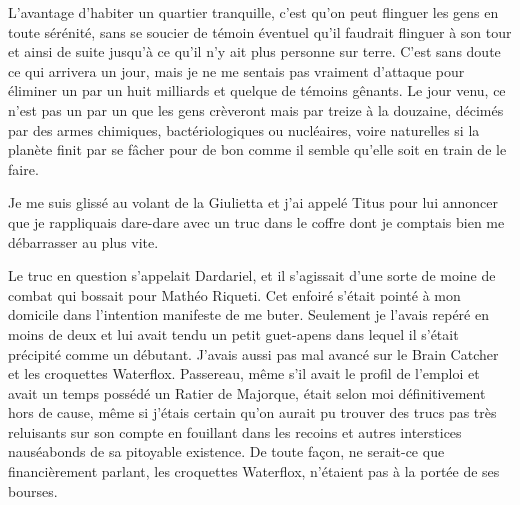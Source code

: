 L’avantage d’habiter un quartier tranquille, c’est qu’on peut flinguer les gens en toute sérénité, sans se soucier de témoin éventuel qu’il faudrait flinguer à son tour et ainsi de suite jusqu’à ce qu’il n’y ait plus personne sur terre. \label{rat:10} C’est sans doute ce qui arrivera un jour, mais je ne me sentais pas vraiment d’attaque pour éliminer un par un huit milliards et quelque de témoins gênants. Le jour venu, ce n’est pas un par un que les gens crèveront mais par treize à la douzaine, décimés par des armes chimiques, bactériologiques ou nucléaires, voire naturelles si la planète finit par se fâcher pour de bon comme il semble qu’elle soit en train de le faire.

Je me suis glissé au volant de la Giulietta et j’ai appelé Titus pour lui annoncer que je rappliquais dare-dare avec un truc dans le coffre dont je comptais bien me débarrasser au plus vite.

Le truc en question s’appelait Dardariel, et il s’agissait d’une sorte de moine de combat qui bossait pour Mathéo Riqueti. Cet enfoiré s’était pointé à mon domicile dans l’intention manifeste de me buter. Seulement je l’avais repéré en moins de deux et lui avait tendu un petit guet-apens dans lequel il s’était précipité comme un débutant. J’avais aussi pas mal avancé sur le Brain Catcher et les croquettes Waterflox. Passereau, même s’il avait le profil de l’emploi et avait un temps possédé un Ratier de Majorque, était selon moi définitivement hors de cause, même si j’étais certain qu’on aurait pu trouver des trucs pas très reluisants sur son compte en fouillant dans les recoins et autres interstices nauséabonds de sa pitoyable existence. De toute façon, ne serait-ce que financièrement parlant, les croquettes Waterflox, n’étaient pas à la portée de ses bourses.

